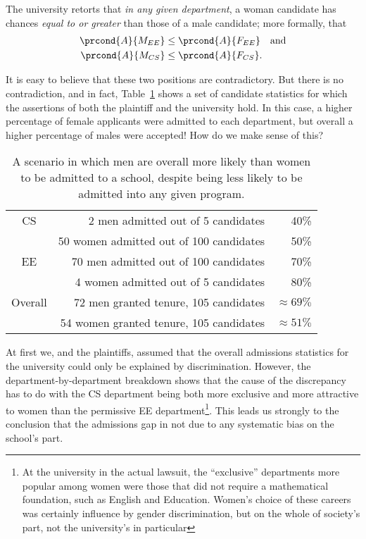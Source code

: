 The university retorts that \emph{in any given department}, a woman
candidate has chances \emph{equal to or greater} than those of a male
candidate; more formally, that
\begin{align*}
\prcond{A}{M_{EE}} & \leq \prcond{A}{F_{EE}} \quad\text{and}\\
\prcond{A}{M_{CS}} & \leq \prcond{A}{F_{CS}}.
\end{align*}

It is easy to believe that these two positions are contradictory.  But
there is no contradiction, and in fact, Table~\ref{fig:15D3} shows a
set of candidate statistics for which the assertions of both the
plaintiff and the university hold.  In this case, a higher percentage
of female applicants were admitted to each department, but overall a
higher percentage of males were accepted!  How do we make sense of
this?

\begin{table}

\begin{tabular}{crr}
CS & 2 men admitted out of 5 candidates      &   40\% \\
   & 50 women admitted out of 100 candidates     &  50\% \\
EE & 70 men admitted out of 100 candidates   &  70\% \\
   & 4 women admitted out of 5 candidates         & 80\% \\
\hline
Overall & 72 men granted tenure, 105 candidates & $\approx 69\%$ \\
        & 54 women granted tenure, 105 candidates   & $\approx 51\%$
\end{tabular}

\caption{A scenario in which men are overall more likely than women to
  be admitted to a school, despite being less likely to be admitted
  into any given program.}

\label{fig:15D3}

\end{table}

At first we, and the plaintiffs, assumed that the overall admissions
statistics for the university could only be explained by
discrimination.  However, the department-by-department breakdown shows
that the cause of the discrepancy has to do with the CS department
being both more exclusive and more attractive to women than the
permissive EE department\footnote{At the university in the actual
  lawsuit, the ``exclusive'' departments more popular among women were
  those that did not require a mathematical foundation, such as
  English and Education.  Women's choice of these careers was
  certainly influence by gender discrimination, but on the whole of society's
  part, not the university's in particular}.  This leads us strongly to the
conclusion that the admissions gap in not due to any systematic bias
on the school's part.

